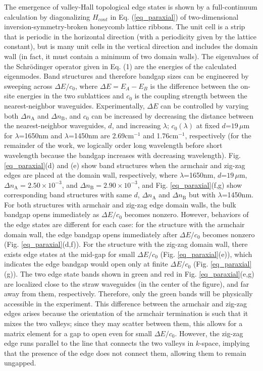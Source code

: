 \documentclass[prl,twocolumn,showpacs,amsmath,amssymb,superscriptaddress]{revtex4-1}
\begin{document}
The emergence of valley-Hall topological edge states is shown by a full-continuum calculation by diagonalizing $H_{cont}$ in Eq. (\ref{eq_paraxial}) of two-dimensional inversion-symmetry-broken honeycomb lattice ribbons.
The unit cell is a strip that is periodic in the horizontal direction (with a periodicity given by the lattice constant), but is many unit cells in the vertical direction and includes the domain wall (in fact, it must contain a minimum of two domain walls).
The eigenvalues of the Schr\"odinger operator given in Eq. (1) are the energies of the calculated eigenmodes.
Band structures and therefore bandgap sizes can be engineered by sweeping across $\Delta E/c_{0}$, where $\Delta E = E_A-E_B$ is the difference between the on-site energies in the two sublattices and $c_{0}$ is the coupling strength between the nearest-neighbor waveguides.
Experimentally, $\Delta E$ can be controlled by varying both $\Delta n_{\textrm{A}}$ and $\Delta n_{\textrm{B}}$, and $c_{0}$ can be increased by decreasing the distance between the nearest-neighbor waveguides, $d$, and increasing $\lambda$; $c_0(\lambda)$ at fixed $d$=$19\,\mu$m for $\lambda$=1650nm and $\lambda$=1450nm are 2.69cm$^{-1}$ and 1.76cm$^{-1}$, respectively (for the remainder of the work, we logically order long wavelength before short wavelength because the bandgap increases with decreasing wavelength).
Fig. \ref{eq_paraxial}(d) and (e) show band structures when the armchair and zig-zag edges are placed at the domain wall, respectively, where $\lambda$=1650nm, $d$=$19\,\mu$m, $\Delta n_{\textrm{A}}=2.50\times 10^{-3}$, and $\Delta n_{\textrm{B}}=2.90\times 10^{-3}$, and Fig. \ref{eq_paraxial}(f,g) show corresponding band structures with same $d$, $\Delta n_{\textrm{A}}$ and $\Delta n_{\textrm{B}}$ but with $\lambda$=1450nm.
For both structures with armchair and zig-zag edge domain walls, the bulk bandgap opens immediately as $\Delta E/c_{0}$ becomes nonzero.
However, behaviors of the edge states are different for each case: for the structure with the armchair domain wall, the edge bandgap opens immediately after $\Delta E/c_{0}$ becomes nonzero (Fig. \ref{eq_paraxial}(d,f)).
For the structure with the zig-zag domain wall, there exists edge states at the mid-gap for small $\Delta E/c_{0}$ (Fig. \ref{eq_paraxial}(e)), which indicates the edge bandgap would open only at finite $\Delta E/c_{0}$ (Fig. \ref{eq_paraxial}(g)).
The two edge state bands shown in green and red in Fig. \ref{eq_paraxial}(e,g) are localized close to the straw waveguides (in the center of the figure), and far away from them, respectively.
Therefore, only the green bands will be physically accessible in the experiment.  
This difference between the armchair and zig-zag edges arises because the orientation of the armchair termination is such that it mixes the two valleys; since they may scatter between them, this allows for a matrix element for a gap to open even for small $\Delta E/c_0$.
However, the zig-zag edge runs parallel to the line that connects the two valleys in $k$-space, implying that the presence of the edge does not connect them, allowing them to remain ungapped.  
\end{document}

